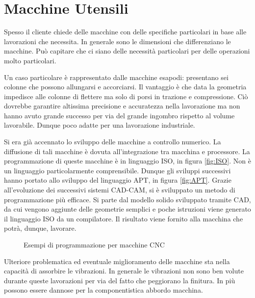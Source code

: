 \chapter{Macchine Utensili}\label{chp:MacchineUtensili}
Spesso il cliente chiede delle macchine con delle specifiche particolari
in base alle lavorazioni che necessita.
In generale sono le dimensioni che differenziano le macchine.
Può capitare che ci siano delle necessità particolari per delle operazioni 
molto particolari.

Un caso particolare è rappresentato dalle macchine esapodi: presentano sei colonne che possono allungarsi e accorciarsi. Il vantaggio è che data la geometria impedisce alle colonne di flettere ma solo di porsi in trazione e compressione.
Ciò dovrebbe garantire altissima precisione e accuratezza nella lavorazione ma non hanno avuto grande successo per via del grande ingombro rispetto al volume lavorabile. Dunque poco adatte per una lavorazione industriale.

Si era già accennato lo sviluppo delle macchine a controllo numerico.
La diffusione di tali macchine è dovuta all'integrazione tra macchina e 
processore. La programmazione di queste macchine è in linguaggio ISO, in figura \ref{fig:ISO}.
Non è un linguaggio particolarmente comprensibile. Dunque gli sviluppi successivi hanno portato allo sviluppo del linguaggio APT, in figura \ref{fig:APT}.
Grazie all'evoluzione dei successivi sistemi CAD-CAM, si è sviluppato un metodo di programmazione più efficace. Si parte dal modello solido sviluppato tramite CAD, da cui vengono aggiunte delle geometrie semplici e poche istruzioni viene generato il linguaggio ISO da un compilatore.
Il risultato viene fornito alla macchina che potrà, dunque, lavorare.

\begin{figure}
\centering
{}\quad
{}
\caption{Esempi di programmazione per macchine CNC}
\label{fig:CNC}
\end{figure}

Ulteriore problematica ed eventuale miglioramento delle macchine sta nella capacità di assorbire le vibrazioni. In generale le vibrazioni non sono ben volute durante queste lavorazioni per via del fatto che peggiorano la finitura. In più possono essere dannose per la componentistica abbordo macchina.

